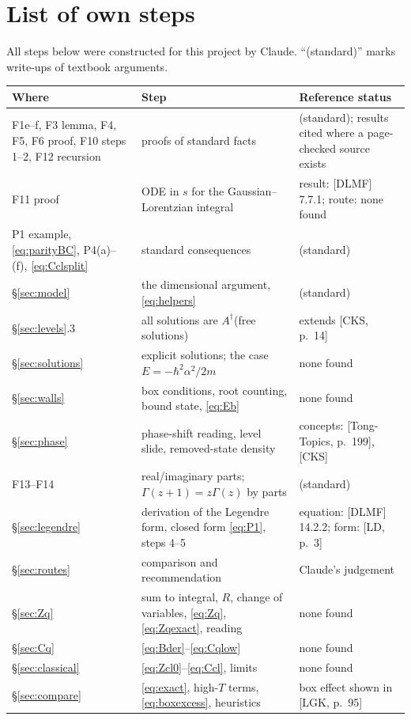 \documentclass[11pt]{article}
\numberwithin{equation}{section}
\newcommand{\Ad}{A^{\dagger}}
\newcommand{\Eu}{\hbar^2\alpha^2/2m}
\begin{document}
\section{List of own steps}
\label{app:own}
All steps below were constructed for this project by Claude. ``(standard)'' marks write-ups of textbook arguments.
\begin{center}
\small
\begin{tabular}{p{}p{}p{}}
\toprule
Where & Step & Reference status\\
\midrule
F1e--f, F3 lemma, F4, F5, F6 proof, F10 steps 1--2, F12 recursion & proofs of standard facts & (standard); results cited where a page-checked source exists\\
F11 proof & ODE in $s$ for the Gaussian--Lorentzian integral & result: [DLMF] 7.7.1; route: none found\\
P1 example, \eqref{eq:parityBC}, P4(a)--(f), \eqref{eq:Cclsplit} & standard consequences & (standard)\\
\S\ref{sec:model} & the dimensional argument, \eqref{eq:helpers} & (standard)\\
\S\ref{sec:levels}.3 & all solutions are $\Ad$(free solutions) & extends [CKS, p.~14]\\
\S\ref{sec:solutions} & explicit solutions; the case $E=-\Eu$ & none found\\
\S\ref{sec:walls} & box conditions, root counting, bound state, \eqref{eq:Eb} & none found\\
\S\ref{sec:phase} & phase-shift reading, level slide, removed-state density & concepts: [Tong-Topics, p.~199], [CKS]\\
F13--F14 & real/imaginary parts; $\Gamma(z+1)=z\Gamma(z)$ by parts & (standard)\\
\S\ref{sec:legendre} & derivation of the Legendre form, closed form \eqref{eq:P1}, steps 4--5 & equation: [DLMF] 14.2.2; form: [LD, p.~3]\\
\S\ref{sec:routes} & comparison and recommendation & Claude's judgement\\
\S\ref{sec:Zq} & sum to integral, $R$, change of variables, \eqref{eq:Zq}, \eqref{eq:Zqexact}, reading & none found\\
\S\ref{sec:Cq} & \eqref{eq:Bder}--\eqref{eq:Cqlow} & none found\\
\S\ref{sec:classical} & \eqref{eq:Zcl0}--\eqref{eq:Ccl}, limits & none found\\
\S\ref{sec:compare} & \eqref{eq:exact}, high-$T$ terms, \eqref{eq:boxexcess}, heuristics & box effect shown in [LGK, p.~95]\\
\bottomrule
\end{tabular}
\end{center}
\end{document}
